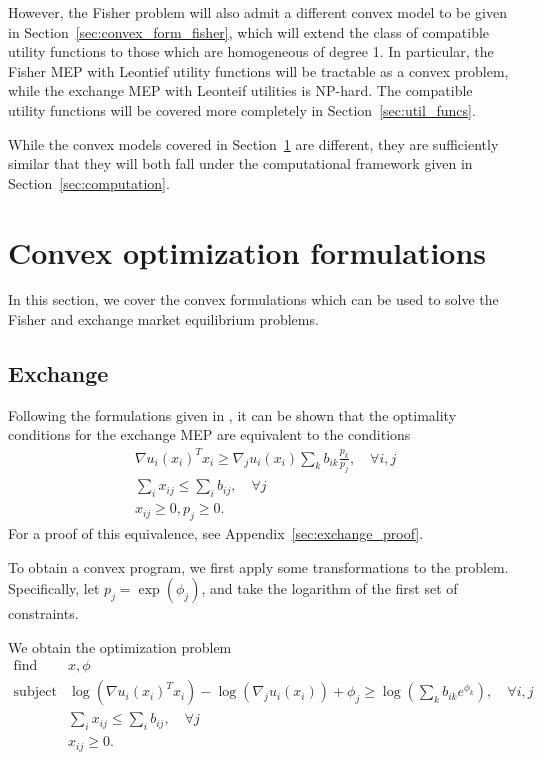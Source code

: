 \documentclass[12pt]{article}
\begin{document}
However, the Fisher problem will also admit a different
convex model to be given in Section~\ref{sec:convex_form_fisher},
which will extend the class of compatible utility functions
to those which are homogeneous of degree 1.
In particular, the Fisher MEP with Leontief utility functions
will be tractable as a convex problem, while the exchange MEP
with Leonteif utilities is NP-hard.
The compatible utility functions will be covered more completely
in Section~\ref{sec:util_funcs}.

While the convex models covered in Section~\ref{sec:convex_form} are different,
they are sufficiently similar that they will both fall under the computational
framework given in Section~\ref{sec:computation}.


\section{Convex optimization formulations}
\label{sec:convex_form}
In this section, we cover the convex formulations which can be used to solve
the Fisher and exchange market equilibrium problems.

\subsection{Exchange}
\label{sec:convex_form_exchange}
Following the formulations given in \cite{jain2007polynomial, chen2007note, nenakov1983algorithm}, it can be shown that the optimality conditions for 
the exchange MEP are equivalent to the conditions
\[
\begin{array}{ll}
& \nabla u_i(x_i)^T x_i \geq  \nabla_j u_i(x_i) \sum_k b_{ik} \frac{p_k}{p_j}, \quad \forall i,j\\
& \sum_i x_{ij} \leq \sum_i b_{ij},\quad \forall j\\
& x_{ij} \geq 0, p_j \geq 0.
\end{array}
\]
For a proof of this equivalence, see Appendix~\ref{sec:exchange_proof}.

To obtain a convex program, we first apply some transformations to the
problem.
Specifically, let $p_j = \exp(\phi_j)$, and take the logarithm of
the first set of constraints.

We obtain the optimization problem %
\begin{equation}
\label{p-exchange}
\begin{array}{ll}
\mbox{find} & x, \phi \\
\mbox{subject to} & \log(\nabla u_i(x_i)^T x_i) - \log(\nabla_j u_i(x_i)) + \phi_j 
\geq \log(\sum_k b_{ik} e^{\phi_k}),\quad \forall i,j\\
& \sum_i x_{ij} \leq \sum_i b_{ij},\quad \forall j\\
& x_{ij} \geq 0.
\end{array}
\end{equation}
\end{document}
